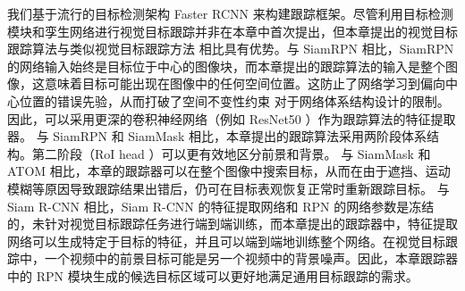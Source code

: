 我们基于流行的目标检测架构 Faster RCNN \cite{ren2015faster} 来构建跟踪框架。尽管利用目标检测模块和孪生网络进行视觉目标跟踪并非在本章中首次提出，但本章提出的视觉目标跟踪算法与类似视觉目标跟踪方法 \cite{SiamRPN, Wang2018SiamMask, danelljan2019atom, voigtlaender2019siam} 相比具有优势。与 SiamRPN \cite{SiamRPN}相比，SiamRPN 的网络输入始终是目标位于中心的图像块，而本章提出的跟踪算法的输入是整个图像，这意味着目标可能出现在图像中的任何空间位置。这防止了网络学习到偏向中心位置的错误先验，从而打破了空间不变性约束 \cite{SiamRPN++} 对于网络体系结构设计的限制。因此，可以采用更深的卷积神经网络（例如 ResNet50 \cite{he2016deep}）作为跟踪算法的特征提取器。
与 SiamRPN \cite{SiamRPN} 和 SiamMask \cite{Wang2018SiamMask} 相比，本章提出的跟踪算法采用两阶段体系结构。第二阶段（RoI head \cite{ren2015faster}）可以更有效地区分前景和背景。
与 SiamMask \cite{Wang2018SiamMask} 和 ATOM \cite{danelljan2019atom} 相比，本章的跟踪器可以在整个图像中搜索目标，从而在由于遮挡、运动模糊等原因导致跟踪结果出错后，仍可在目标表观恢复正常时重新跟踪目标。
与 Siam R-CNN \cite{voigtlaender2019siam} 相比，Siam R-CNN 的特征提取网络和 RPN 的网络参数是冻结的，未针对视觉目标跟踪任务进行端到端训练，而本章提出的跟踪器中，特征提取网络可以生成特定于目标的特征，并且可以端到端地训练整个网络。在视觉目标跟踪中，一个视频中的前景目标可能是另一个视频中的背景噪声。因此，本章跟踪器中的 RPN 模块生成的候选目标区域可以更好地满足通用目标跟踪的需求。


